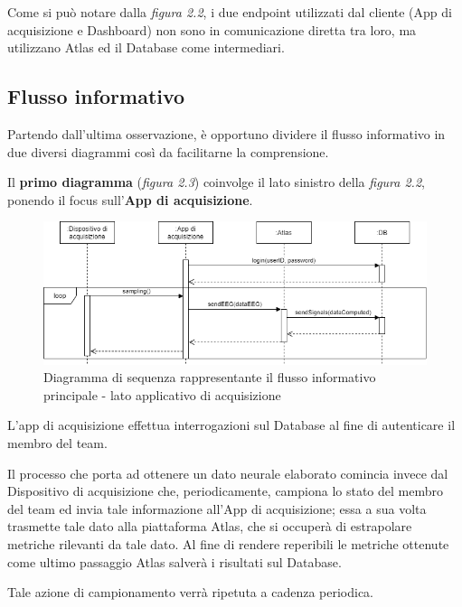 \noindent Come si può notare dalla \emph{figura 2.2}, i due endpoint utilizzati dal cliente (App di acquisizione e Dashboard) non sono in comunicazione diretta tra loro, ma utilizzano Atlas ed il Database come intermediari.
\subsection{Flusso informativo}
Partendo dall'ultima osservazione, è opportuno dividere il flusso informativo in due diversi diagrammi così da facilitarne la comprensione.\newline

\noindent Il {\bf primo diagramma} (\emph{figura 2.3}) coinvolge il lato sinistro della \emph{figura 2.2}, ponendo il focus sull'{\bf App di acquisizione}.
\vspace{10mm}
\begin{figure}[H]
  \centering
  \includegraphics[width=1.0\textwidth]{img/diagramma_sequenza_alto_app_acquisizione.png}
  \caption{Diagramma di sequenza rappresentante il flusso informativo principale - lato applicativo di acquisizione}
\end{figure}
\vspace{5mm}
\noindent L'app di acquisizione effettua interrogazioni sul Database al fine di autenticare il membro del team.\newline

\noindent Il processo che porta ad ottenere un dato neurale elaborato comincia invece dal Dispositivo di acquisizione che, periodicamente, campiona lo stato del membro del team ed invia tale informazione all'App di acquisizione; essa a sua volta trasmette tale dato alla piattaforma Atlas, che si occuperà di estrapolare metriche rilevanti da tale dato.\newline
Al fine di rendere reperibili le metriche ottenute come ultimo passaggio Atlas salverà i risultati sul Database.\newline

\noindent Tale azione di campionamento verrà ripetuta a cadenza periodica.

